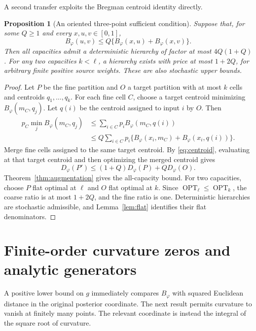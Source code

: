 \documentclass[11pt]{article}
\newtheorem{proposition}[theorem]{Proposition}
\theoremstyle{definition}\newtheorem{definition}[theorem]{Definition}
\theoremstyle{remark}\newtheorem{remark}[theorem]{Remark}
\newcommand{\ph}{\varphi}
\newcommand{\B}{B_{\ph}}
\newcommand{\D}{D_{\ph}}
\newcommand{\OPT}{\operatorname{OPT}}
\begin{document}
A second transfer exploits the Bregman centroid identity directly.
\begin{proposition}[An oriented three-point sufficient condition]
\label{prop:qt}
Suppose that, for some $Q\ge1$ and every $x,u,v\in[0,1]$,
\begin{equation}
\B(u,v)\le Q\{\B(x,u)+\B(x,v)\}.
\label{eq:qt}
\end{equation}
Then all capacities admit a deterministic hierarchy of factor at most $4Q(1+Q)$. For any two capacities $k<\ell$, a hierarchy exists with price at most $1+2Q$, for arbitrary finite positive source weights. These are also stochastic upper bounds.
\end{proposition}
\begin{proof}
Let $P$ be the fine partition and $O$ a target partition with at most $k$ cells and centroids $q_1,\ldots,q_k$. For each fine cell $C$, choose a target centroid minimizing $\B(m_C,q_j)$. Let $q(i)$ be the centroid assigned to input $i$ by $O$. Then
\begin{align*}
p_C\min_j\B(m_C,q_j)
&\le\sum_{i\in C}p_i\B(m_C,q(i))\\
&\le Q\sum_{i\in C}p_i\{\B(x_i,m_C)+\B(x_i,q(i))\}.
\end{align*}
Merge fine cells assigned to the same target centroid. By \eqref{eq:centroid}, evaluating at that target centroid and then optimizing the merged centroid gives
\begin{equation}
\D(P')\le(1+Q)\D(P)+Q\D(O).
\label{eq:nesting}
\end{equation}
Theorem~\ref{thm:augmentation} gives the all-capacity bound. For two capacities, choose $P$ flat optimal at $\ell$ and $O$ flat optimal at $k$. Since $\OPT_\ell\le\OPT_k$, the coarse ratio is at most $1+2Q$, and the fine ratio is one. Deterministic hierarchies are stochastic admissible, and Lemma~\ref{lem:flat} identifies their flat denominators.
\end{proof}

\section{Finite-order curvature zeros and analytic generators}
\label{sec:finiteorder}
A positive lower bound on $g$ immediately compares $\B$ with squared Euclidean distance in the original posterior coordinate. The next result permits curvature to vanish at finitely many points. The relevant coordinate is instead the integral of the square root of curvature.
\end{document}
